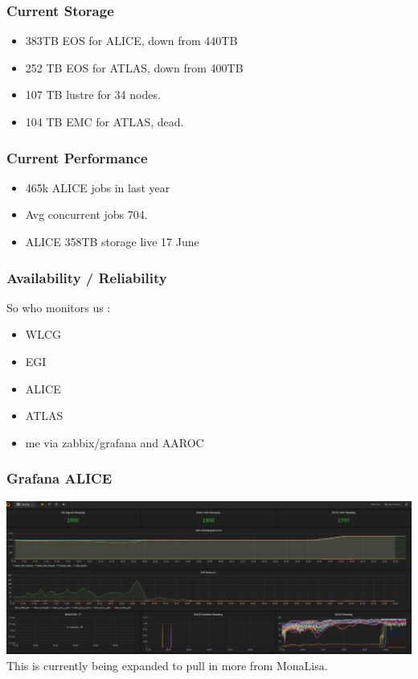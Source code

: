 \documentclass{beamer}
\begin{document}
\begin{frame}
  \frametitle{Current Storage}
  \begin{itemize}
    \item 383TB EOS for ALICE, down from 440TB
    \item 252 TB EOS for ATLAS, down from 400TB
    \item 107 TB lustre for 34 nodes.
    \item 104 TB EMC for ATLAS, dead.
  \end{itemize}
\end{frame}


\begin{frame}
  \frametitle{Current Performance}
\begin{itemize}
  \item 465k ALICE jobs in last year
  \item Avg concurrent jobs 704.
  \item ALICE 358TB storage live 17 June
\end{itemize}
\end{frame}

\begin{frame}
  \frametitle{Availability / Reliability}
  So who monitors us :
  \begin{itemize}
    \item WLCG
    \item EGI
    \item ALICE
    \item ATLAS
    \item me via zabbix/grafana and AAROC 
  \end{itemize}

\end{frame}

\begin{frame}
  \frametitle{Grafana ALICE}
  \includegraphics[scale=0.25]{ALICEProcessing-Grafana.pdf}
  This is currently being expanded to pull in more from MonaLisa.
\end{frame}
\end{document}
